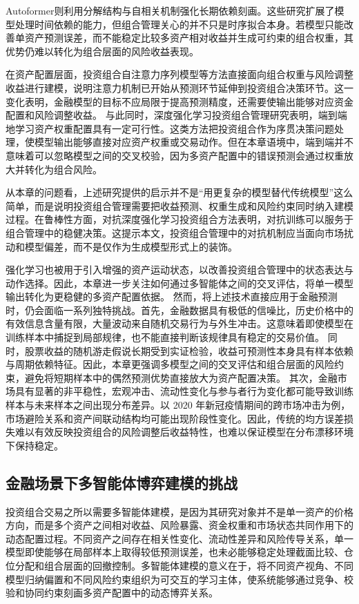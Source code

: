 Autoformer则利用分解结构与自相关机制强化长期依赖刻画\cite{wu2021autoformer}。这些研究扩展了模型处理时间依赖的能力，但组合管理关心的并不只是时序拟合本身。若模型只能改善单资产预测误差，而不能稳定比较多资产相对收益并生成可约束的组合权重，其优势仍难以转化为组合层面的风险收益表现。

在资产配置层面，投资组合自注意力序列模型等方法直接面向组合权重与风险调整收益进行建模，说明注意力机制已开始从预测环节延伸到投资组合决策环节\cite{kisiel2022portfolio}。这一变化表明，金融模型的目标不应局限于提高预测精度，还需要使输出能够对应资金配置和风险调整收益。
与此同时，深度强化学习投资组合管理研究表明，端到端地学习资产权重配置具有一定可行性\cite{jiang2017deep}。这类方法把投资组合作为序贯决策问题处理，使模型输出能够直接对应资产权重或交易动作。但在本章语境中，端到端并不意味着可以忽略模型之间的交叉校验，因为多资产配置中的错误预测会通过权重放大并转化为组合风险。

从本章的问题看，上述研究提供的启示并不是“用更复杂的模型替代传统模型”这么简单，而是说明投资组合管理需要把收益预测、权重生成和风险约束同时纳入建模过程。在鲁棒性方面，对抗深度强化学习投资组合方法表明，对抗训练可以服务于组合管理中的稳健决策\cite{liang2018adversarial}。这提示本文，投资组合管理中的对抗机制应当面向市场扰动和模型偏差，而不是仅作为生成模型形式上的装饰。

强化学习也被用于引入增强的资产运动状态，以改善投资组合管理中的状态表达与动作选择\cite{ye2020reinforcement}。因此，本章进一步关注如何通过多智能体之间的交叉评估，将单一模型输出转化为更稳健的多资产配置依据。
然而，将上述技术直接应用于金融预测时，仍会面临一系列独特挑战。首先，金融数据具有极低的信噪比，历史价格中的有效信息含量有限，大量波动来自随机交易行为与外生冲击\cite{lo2017economics}。这意味着即使模型在训练样本中捕捉到局部规律，也不能直接判断该规律具有稳定的交易价值。
同时，股票收益的随机游走假说长期受到实证检验，收益可预测性本身具有样本依赖与周期依赖特征\cite{lo1988stock}。因此，本章更强调多模型之间的交叉评估和组合层面的风险约束，避免将短期样本中的偶然预测优势直接放大为资产配置决策。
其次，金融市场具有显著的非平稳性，宏观冲击、流动性变化与参与者行为变化都可能导致训练样本与未来样本之间出现分布差异。以 2020 年新冠疫情期间的跨市场冲击为例，市场避险关系和资产间联动结构均可能出现阶段性变化\cite{conlon2020time}。因此，传统的均方误差损失难以有效反映投资组合的风险调整后收益特性，也难以保证模型在分布漂移环境下保持稳定。

\subsection{金融场景下多智能体博弈建模的挑战}
投资组合交易之所以需要多智能体建模，是因为其研究对象并不是单一资产的价格方向，而是多个资产之间相对收益、风险暴露、资金权重和市场状态共同作用下的动态配置过程。不同资产之间存在相关性变化、流动性差异和风险传导关系，单一模型即使能够在局部样本上取得较低预测误差，也未必能够稳定处理截面比较、仓位分配和组合层面的回撤控制。多智能体建模的意义在于，将不同资产视角、不同模型归纳偏置和不同风险约束组织为可交互的学习主体，使系统能够通过竞争、校验和协同约束刻画多资产配置中的动态博弈关系。

